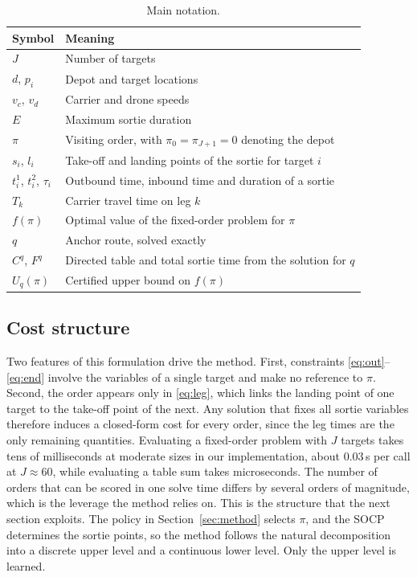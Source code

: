 \documentclass[preprint,12pt,authoryear]{elsarticle}
\begin{document}
\begin{table}[t]
\centering
\caption{Main notation.}
\label{tab:notation}
\small
\begin{tabular}{ll}
\toprule
Symbol & Meaning \\
\midrule
$J$ & Number of targets \\
$d$, $p_{i}$ & Depot and target locations \\
$v_{c}$, $v_{d}$ & Carrier and drone speeds \\
$E$ & Maximum sortie duration \\
$\pi$ & Visiting order, with $\pi_{0} = \pi_{J+1} = 0$ denoting the depot \\
$s_{i}$, $l_{i}$ & Take-off and landing points of the sortie for target $i$ \\
$t^{1}_{i}$, $t^{2}_{i}$, $\tau_{i}$ & Outbound time, inbound time and duration of a sortie \\
$T_{k}$ & Carrier travel time on leg $k$ \\
$f(\pi)$ & Optimal value of the fixed-order problem for $\pi$ \\
$q$ & Anchor route, solved exactly \\
$C^{q}$, $F^{q}$ & Directed table and total sortie time from the solution for $q$ \\
$U_{q}(\pi)$ & Certified upper bound on $f(\pi)$ \\
\bottomrule
\end{tabular}
\end{table}

\subsection{Cost structure}

Two features of this formulation drive the method. First, constraints \eqref{eq:out}--\eqref{eq:end} involve the variables of a single target and make no reference to $\pi$. Second, the order appears only in \eqref{eq:leg}, which links the landing point of one target to the take-off point of the next. Any solution that fixes all sortie variables therefore induces a closed-form cost for every order, since the leg times are the only remaining quantities. Evaluating a fixed-order problem with $J$ targets takes tens of milliseconds at moderate sizes in our implementation, about 0.03\,s per call at $J \approx 60$, while evaluating a table sum takes microseconds. The number of orders that can be scored in one solve time differs by several orders of magnitude, which is the leverage the method relies on. This is the structure that the next section exploits. The policy in Section~\ref{sec:method} selects $\pi$, and the SOCP determines the sortie points, so the method follows the natural decomposition into a discrete upper level and a continuous lower level. Only the upper level is learned.
\end{document}
